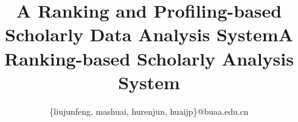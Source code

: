 \documentclass[10pt,conference,letterpaper]{IEEEtran}
\newcommand{\eat}[1]{}
\newcommand{\kw}[1]{{\ensuremath {\mathsf{#1}}}\xspace}
\newcommand{\oursystem}{\kw{Athena}}
\begin{document}
\title{A Ranking and Profiling-based Scholarly Data Analysis System}
\title{A Ranking-based Scholarly Analysis System}

\eat{
\author{\IEEEauthorblockN{Michael Shell}
\IEEEauthorblockA{School of Electrical and\\Computer Engineering\\
Georgia Institute of Technology\\
Atlanta, Georgia 30332--0250\\
Email: http://www.michaelshell.org/contact.html}
\and
\IEEEauthorblockN{Homer Simpson}
\IEEEauthorblockA{Twentieth Century Fox\\
Springfield, USA\\
Email: homer@thesimpsons.com}
\and
\IEEEauthorblockN{James Kirk\\ and Montgomery Scott}
\IEEEauthorblockA{Starfleet Academy\\
San Francisco, California 96678--2391\\
Telephone: (800) 555--1212\\
Fax: (888) 555--1212}}
}%

\author{
\{liujunfeng, mashuai, hurenjun, huaijp\}@buaa.edu.cn}

\maketitle
\end{document}
